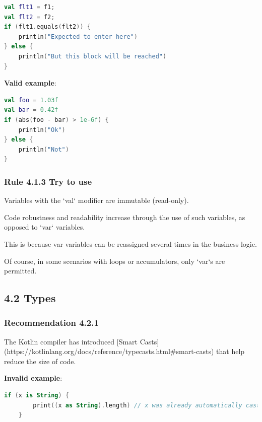{{{{\begin{lstlisting}[language=Kotlin]
val flt1 = f1;
val flt2 = f2;
if (flt1.equals(flt2)) {
    println("Expected to enter here")
} else {
    println("But this block will be reached")
}
\end{lstlisting}


\textbf{Valid example}:



\begin{lstlisting}[language=Kotlin]
val foo = 1.03f
val bar = 0.42f
if (abs(foo - bar) > 1e-6f) {
    println("Ok")
} else {
    println("Not")
}
\end{lstlisting}


\subsubsection*{\textbf{Rule 4.1.3 Try to use}}
\leavevmode\newline



Variables with the `val` modifier are immutable (read-only).

Code robustness and readability increase through the use of such variables, as opposed to `var` variables.

This is because var variables can be reassigned several times in the business logic.

Of course, in some scenarios with loops or accumulators, only `var`s are permitted.



\subsection*{\textbf{4.2 Types}}

\subsubsection*{\textbf{Recommendation 4.2.1}}
\leavevmode\newline



The Kotlin compiler has introduced [Smart Casts](https://kotlinlang.org/docs/reference/typecasts.html\#smart-casts) that help reduce the size of code.



\textbf{Invalid example}:

\begin{lstlisting}[language=Kotlin]
    if (x is String) {
        print((x as String).length) // x was already automatically cast to String - no need to use 'as' keyword here
    }
\end{lstlisting}


}}}}

